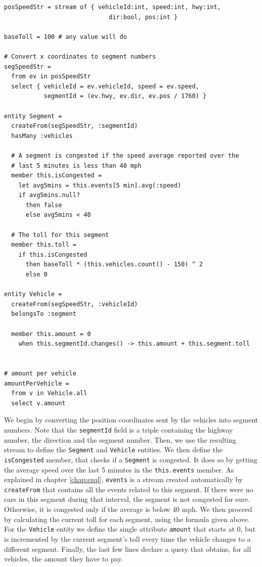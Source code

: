 \begin{lstlisting}
posSpeedStr = stream of { vehicleId:int, speed:int, hwy:int,
                             dir:bool, pos:int }

baseToll = 100 # any value will do

# Convert x coordinates to segment numbers
segSpeedStr =
  from ev in posSpeedStr
  select { vehicleId = ev.vehicleId, speed = ev.speed,
           segmentId = (ev.hwy, ev.dir, ev.pos / 1760) }

entity Segment =
  createFrom(segSpeedStr, :segmentId)
  hasMany :vehicles

  # A segment is congested if the speed average reported over the
  # last 5 minutes is less than 40 mph
  member this.isCongested =
    let avg5mins = this.events[5 min].avg(:speed)
    if avg5mins.null?
      then false
      else avg5mins < 40

  # The toll for this segment
  member this.toll =
    if this.isCongested
      then baseToll * (this.vehicles.count() - 150) ^ 2
      else 0

entity Vehicle =
  createFrom(segSpeedStr, :vehicleId)
  belongsTo :segment

  member this.amount = 0
    when this.segmentId.changes() -> this.amount + this.segment.toll


# amount per vehicle
amountPerVehicle =
  from v in Vehicle.all
  select v.amount
\end{lstlisting}

We begin by converting the position coordinates sent by the vehicles
into segment numbers. Note that the \verb=segmentId= field is a triple
containing the highway number, the direction and the segment number.
Then, we use the resulting stream to define the \verb=Segment= and
\verb=Vehicle= entities. We then define the \verb=isCongested= member,
that checks if a \verb=Segment= is congested. It does so by getting
the average speed over the last 5 minutes in the \verb=this.events=
member. As explained in chapter \ref{chap:ezql}, \verb=events= is a
stream created automatically by \verb=createFrom= that contains all
the events related to this segment. If there were no cars in this
segment during that interval, the segment is not congested for
sure. Otherwise, it is congested only if the average is below 40
mph. We then proceed by calculating the current toll for each segment,
using the formula given above. For the \verb=Vehicle= entity we define
the single attribute \verb=amount= that starts at 0, but is
incremented by the current segment's toll every time the vehicle
changes to a different segment. Finally, the last few lines declare a
query that obtains, for all vehicles, the amount they have to pay.

